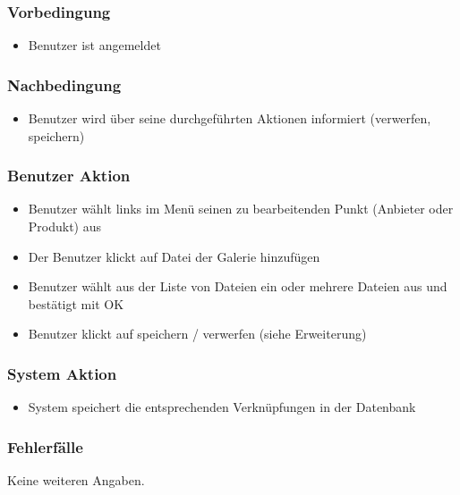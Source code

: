 \documentclass[a4paper,12pt]{article}
\begin{document}
\subsubsection{Vorbedingung}\label{vorbedingung-5}

\begin{itemize}

\item
  Benutzer ist angemeldet
\end{itemize}

\subsubsection{Nachbedingung}\label{nachbedingung-5}

\begin{itemize}

\item
  Benutzer wird über seine durchgeführten Aktionen informiert
  (verwerfen, speichern)
\end{itemize}

\subsubsection{Benutzer Aktion}\label{benutzer-aktion-5}

\begin{itemize}

\item
  Benutzer wählt links im Menü seinen zu bearbeitenden Punkt (Anbieter
  oder Produkt) aus
\item
  Der Benutzer klickt auf Datei der Galerie hinzufügen
\item
  Benutzer wählt aus der Liste von Dateien ein oder mehrere Dateien aus
  und bestätigt mit OK
\item
  Benutzer klickt auf speichern / verwerfen (siehe Erweiterung)
\end{itemize}

\subsubsection{System Aktion}\label{system-aktion-5}

\begin{itemize}

\item
  System speichert die entsprechenden Verknüpfungen in der Datenbank
\end{itemize}

\subsubsection{Fehlerfälle}\label{fehlerfalle-5}
Keine weiteren Angaben.
\end{document}
